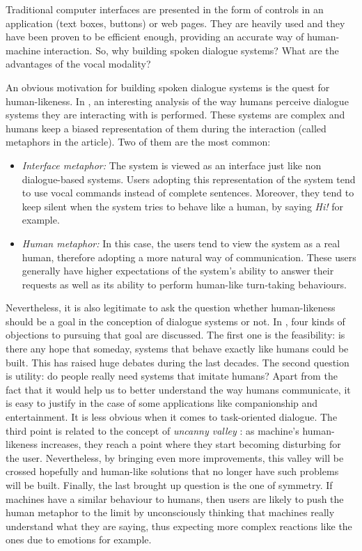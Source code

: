 		Traditional computer interfaces are presented in the form of controls in an application (text boxes, buttons) or web pages. They are heavily used and they have been proven to be efficient enough, providing an accurate way of human-machine interaction. So, why building spoken dialogue systems? What are the advantages of the vocal modality?
			
		An obvious motivation for building spoken dialogue systems is the quest for human-likeness. In \cite{Edlund2008}, an interesting analysis of the way humans perceive dialogue systems they are interacting with is performed. These systems are complex and humans keep a biased representation of them during the interaction (called metaphors in the article). Two of them are the most common:
		
		\begin{itemize}
			\item \textit{Interface metaphor:} The system is viewed as an interface just like non dialogue-based systems. Users adopting this representation of the system tend to use vocal commands instead of complete sentences. Moreover, they tend to keep silent when the system tries to behave like a human, by saying \textit{Hi!} for example.
			\item \textit{Human metaphor:} In this case, the users tend to view the system as a real human, therefore adopting a more natural way of communication. These users generally have higher expectations of the system's ability to answer their requests as well as its ability to perform human-like turn-taking behaviours.
		\end{itemize}
		
		Nevertheless, it is also legitimate to ask the question whether human-likeness should be a goal in the conception of dialogue systems or not. In \cite{Edlund2008}, four kinds of objections to pursuing that goal are discussed. The first one is the feasibility: is there any hope that someday, systems that behave exactly like humans could be built. This has raised huge debates during the last decades. The second question is utility: do people really need systems that imitate humans? Apart from the fact that it would help us to better understand the way humans communicate, it is easy to justify in the case of some applications like companionship and entertainment. It is less obvious when it comes to task-oriented dialogue. The third point is related to the concept of \textit{uncanny valley} \cite{Mori1970}: as machine's human-likeness increases, they reach a point where they start becoming disturbing for the user. Nevertheless, by bringing even more improvements, this valley will be crossed hopefully and human-like solutions that no longer have such problems will be built. Finally, the last brought up question is the one of symmetry. If machines have a similar behaviour to humans, then users are likely to push the human metaphor to the limit by unconsciously thinking that machines really understand what they are saying, thus expecting more complex reactions like the ones due to emotions for example.

